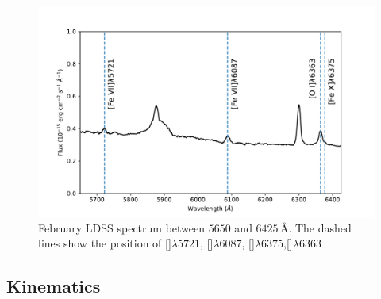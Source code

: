 \documentclass[../main.tex]{subfiles}
\begin{document}
\begin{figure}
\centering
\includegraphics[width=\textwidth]{images/paper3/Fe_lines.pdf} 
\caption[]{February LDSS spectrum between $5650$ and $6425\,\si{\angstrom}$. The dashed lines show the position of []$\lambda5721$,  []$\lambda6087$, []$\lambda6375$,[]$\lambda6363$} 
\label{fig:fe_lines}
\end{figure} 

\subsection{Kinematics}
\label{sec:pap3_kinematics}
\end{document}
